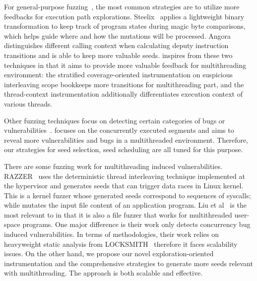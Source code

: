 For general-purpose fuzzing~\cite{Bohme:2016:CGF,LiCMLLT17,CollAFL,Angora,FairFuzz,redqueen}, the most common strategies are to utilize more feedbacks for execution path explorations. Steelix~\cite{LiCMLLT17} applies a lightweight binary transformation to keep track of program states during magic byte comparisons, which helps guide where and how the mutations will be processed. Angora~\cite{Angora} distinguishes different calling context when calculating deputy instruction transitions and is able to keep more valuable seeds. \mtfuzz inspires from these two techniques in that it aims to provide more valuable feedback for multithreading environment: the stratified coverage-oriented instrumentation on suspicious interleaving scope \mtiscope bookkeeps more transitions for multithreading part, and the thread-context instrumentation additionally differentiates execution context of various threads.

Other fuzzing techniques focus on detecting certain categories of bugs or vulnerabilities~\cite{Bohme:2017:DGF,hawkeye,perffuzz,slowfuzz,junjie:2017sp:skyfire,superion,smart_gbf}.  \mtfuzz focuses on the concurrently executed segments and aims to reveal more vulnerabilities and bugs in a multithreaded environment. Therefore, our strategies for seed selection, seed scheduling are all tuned for this purpose.

There are some fuzzing work for multithreading induced vulnerabilities. RAZZER~\cite{razzer} uses the deterministic thread interleaving technique implemented at the hypervisor and generates seeds that can trigger data races in Linux kernel. This is a kernel fuzzer whose generated seeds correspond to sequences of syscalls; while \mtfuzz mutates the input file content of an application program. Liu et al~\cite{LiuZLZ018} is the most relevant to \mtfuzz in that it is also a file fuzzer that works for multithreaded user-space programs. One major difference is their work only detects concurrency bug induced vulnerabilities. In terms of methodologies, their work relies on heavyweight static analysis from LOCKSMITH~\cite{pratikakis2006locksmith} therefore it faces scalability issues. On the other hand, we propose our novel exploration-oriented instrumentation and the comprehensive strategies to generate more seeds relevant with multithreading. The approach is both scalable and effective.



